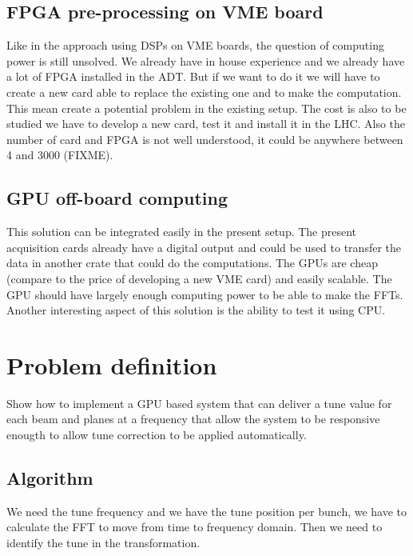 \subsection{FPGA pre-processing on VME board}

Like in the approach using \glspl{DSP} on VME boards, the question of computing power is still unsolved. We already have in house experience and we already have a lot of \gls{FPGA} installed in the \gls{ADT}. But if we want to do it we will have to create a new card able to replace the existing one and to make the computation. This mean create a potential problem in the existing setup. The cost is also to be studied we have to develop a new card, test it and install it in the \gls{LHC}. Also the number of card and FPGA is not well understood, it could be anywhere between 4 and 3000 (FIXME).

\subsection{GPU off-board computing}

This solution can be integrated easily in the present setup. The present acquisition cards already have a digital output and could be used to transfer the data in another crate that could do the computations. The \glspl{GPU} are cheap (compare to the price of developing a new \gls{VME} card) and easily scalable. The \gls{GPU} should have largely enough computing power to be able to make the \glspl{FFT}. Another interesting aspect of this solution is the ability to test it using \gls{CPU}.

\section{Problem definition}

Show how to implement a GPU based system that can deliver a tune value for each beam and planes at a frequency that allow the system to be responsive enougth to allow tune correction to be applied automatically. 

   \subsection{Algorithm}

   We need the tune frequency and we have the tune position per bunch, we have to calculate the FFT to move from time to frequency domain. Then we need to identify the tune in the transformation.

